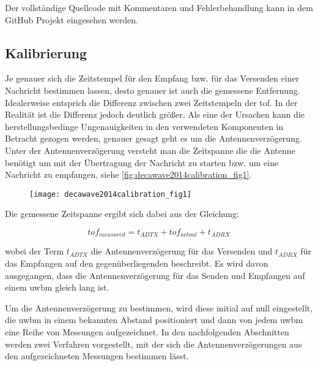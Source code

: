 Der vollständige Quellcode mit Kommentaren und Fehlerbehandlung kann in dem GitHub Projekt \cite{kasdorf2017roslamwithuwb} eingesehen werden.


%
%
%
\subsection{Kalibrierung}

Je genauer sich die Zeitstempel für den Empfang bzw. für das Versenden einer Nachricht bestimmen lassen, desto genauer ist auch die gemessene Entfernung. Idealerweise entsprich die Differenz zwischen zwei Zeitstempeln der \Gls{tof}. In der Realität ist die Differenz jedoch deutlich größer. Als eine der Ursachen kann die herstellungsbedinge Ungenauigkeiten in den verwendeten Komponenten in Betracht gezogen werden, genauer gesagt geht es um die Antennenverzögerung. Unter der Antennenverzögerung versteht man die Zeitspanne die die Antenne benötigt um mit der Übertragung der Nachricht zu starten bzw. um eine Nachricht zu empfangen, siehe  \autoref{fig:decawave2014calibration_fig1}.

\begin{figure}[h]
	\centering
	\texttt{[image: decawave2014calibration\_fig1]}
	\label{fig:decawave2014calibration_fig1}
\end{figure}

Die gemessene Zeitspanne ergibt sich dabei aus der Gleichung: 

\begin{equation}
tof_{measured}=t_{ADTX}+tof_{actual}+t_{ADRX}\label{eq:antenna_delay_1}
\end{equation}

wobei der Term $t_{ADTX}$ die Antennenverzögerung für das Versenden und $t_{ADRX}$ für das Empfangen auf den gegenüberliegenden  beschreibt. Es wird davon ausgegangen, dass die Antennenverzögerung für das Senden und Empfangen auf einem \Gls{uwbm} gleich lang ist. \cite{decawave2016dw1kusermanual}

Um die Antennenverzögerung zu bestimmen, wird diese initial auf null eingestellt, die \Gls{uwbm} in einem bekannten Abstand positioniert und dann von jedem \Gls{uwbm} eine Reihe von Messungen aufgezeichnet. In den nachfolgenden Abschnitten werden zwei Verfahren vorgestellt, mit der sich die Antennenverzögerungen aus den aufgezeichneten Messungen bestimmen lässt.


